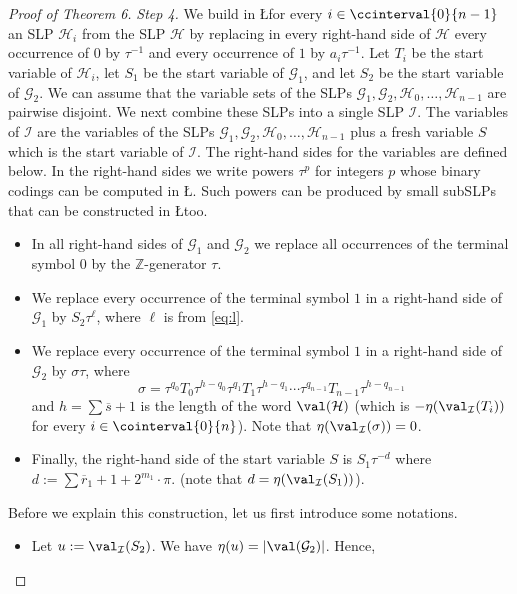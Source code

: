 \begin{proof}[Proof of Theorem 6]
\medskip
\noindent
{\em Step 4.}
We build in \L for every $i \in \ccinterval{0}{n-1}$ an
SLP $\mathcal{H}_i$ 
from the SLP $\mathcal{H}$ by replacing in every right-hand side of $\mathcal{H}$ 
every occurrence of $0$  by $\tau^{-1}$ and
every occurrence of $1$  by $a_i \tau^{-1}$.
Let $T_i$ be the start variable of $\mathcal{H}_i$, let $S_1$ be the start variable of $\mathcal{G}_1$, and let
$S_2$ be the start variable of $\mathcal{G}_2$.
We can assume that the variable sets of the SLPs $\mathcal{G}_1, \mathcal{G}_2, \mathcal{H}_0, \ldots, \mathcal{H}_{n-1}$
are pairwise disjoint.  We next combine these SLPs into a single SLP $\mathcal{I}$.
The variables of $\mathcal{I}$ are the variables of 
the SLPs $\mathcal{G}_1, \mathcal{G}_2,  \mathcal{H}_0, \ldots, \mathcal{H}_{n-1}$ plus a fresh variable $S$ which is the start
variable of $\mathcal{I}$. The right-hand sides for the variables are defined below. In the right-hand sides 
we write powers $\tau^p$ for integers $p$
whose binary codings can be computed in \L. Such powers can be produced by small subSLPs that can be constructed in \L too.
\begin{itemize}
\item In all right-hand sides of $\mathcal{G}_1$  and $\mathcal{G}_2$ 
we replace all occurrences of the terminal symbol $0$ by the $\mathbb{Z}$-generator $\tau$. 
\item We replace every
occurrence of the terminal symbol $1$ in a right-hand side of $\mathcal{G}_1$ by $S_2 \tau^\ell$,
where $\ell$ is from \eqref{eq:l}.
\item We  replace every
occurrence of the terminal symbol $1$ in a right-hand side of $\mathcal{G}_2$ by
$\sigma \tau$, where
\begin{equation} \label{eq-sigma}
\sigma = \tau^{q_{0}} T_0 \tau^{h-q_{0}} \tau^{q_{1}} T_1 \tau^{h-q_{1}} \cdots \tau^{q_{n-1}} T_{n-1} \tau^{h-q_{n-1}}
\end{equation}
and $h = \sum \overline{s}+1$ is the length of the word
$\val(\mathcal{H})$ (which is $-\eta(\val_{\mathcal{I}}(T_i))$ for every  $i \in\cointerval{0}{n}$).
Note that $\eta(\val_{\mathcal{I}}(\sigma)) = 0$.
\item Finally, 
the right-hand side of the start variable $S$ is  $S_1 \tau^{-d}$ where $d := \sum \overline{r}_1 + 1 + 2^{m_1} \cdot \pi$.
(note that $d = \eta(\val_{\mathcal{I}}(S_1))$).
\end{itemize}
Before we explain this construction, let us first introduce some notations.
\begin{itemize}
\item Let $u := \val_{\mathcal{I}}(S_2)$. We have $\eta(u) = |\val(\mathcal{G}_2)|$. Hence,

\end{itemize}
\end{proof}
